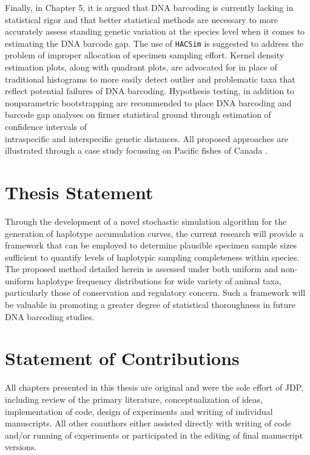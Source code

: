 Finally, in Chapter 5, it is argued that DNA barcoding is currently lacking in statistical rigor and that better statistical methods are necessary to more accurately assess standing genetic variation at the species level when it comes to estimating the DNA barcode gap. The use of {\tt HACSim} is suggested to address the problem of improper allocation of specimen sampling effort. Kernel density estimation plots, along with quadrant plots, are advocated for in place of traditional histograms to more easily detect outlier and problematic taxa that reflect potential failures of DNA barcoding. Hypothesis testing, in addition to \\ nonparametric bootstrapping are recommended to place DNA barcoding and barcode gap analyses on firmer statistical ground through estimation of confidence intervals of \\ intraspecific and interspecific genetic distances. All proposed approaches are illustrated through a case study focussing on Pacific fishes of Canada \cite{steinke2009dna}.



\section{Thesis Statement}

Through the development of a novel stochastic simulation algorithm for the generation of haplotype accumulation curves, the current research will provide a framework that can be employed to determine plausible specimen sample sizes sufficient to quantify levels of haplotypic sampling completeness within species. The proposed method detailed herein is assessed under both uniform and non-uniform haplotype frequency distributions for wide variety of animal taxa, particularly those of conservation and regulatory concern. Such a framework will be valuable in promoting a greater degree of statistical thoroughness in future DNA barcoding studies. 



\section{Statement of Contributions}
  
All chapters presented in this thesis are original and were the sole effort of JDP, \\ including review of the primary literature, conceptualization of ideas, implementation of code, design of experiments and writing of individual manuscripts. All other coauthors either assisted directly with writing of code and/or running of experiments or participated in the editing of final manuscript versions.



